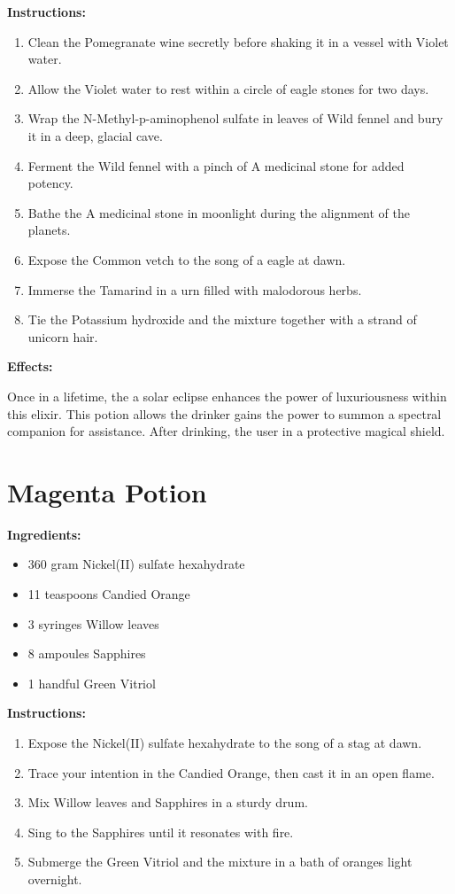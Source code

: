 \documentclass{article}
\begin{document}
\textbf{Instructions:}

\begin{enumerate}
  \item Clean the Pomegranate wine secretly before shaking it in a vessel with Violet water.
  \item Allow the Violet water to rest within a circle of eagle stones for two days.
  \item Wrap the N-Methyl-p-aminophenol sulfate in leaves of Wild fennel and bury it in a deep, glacial cave.
  \item Ferment the Wild fennel with a pinch of A medicinal stone for added potency.
  \item Bathe the A medicinal stone in moonlight during the alignment of the planets.
  \item Expose the Common vetch to the song of a eagle at dawn.
  \item Immerse the Tamarind in a urn filled with malodorous herbs.
  \item Tie the Potassium hydroxide and the mixture together with a strand of unicorn hair.
\end{enumerate}

\textbf{Effects:}

Once in a lifetime, the a solar eclipse enhances the power of luxuriousness within this elixir. This potion allows the drinker gains the power to summon a spectral companion for assistance. After drinking, the user in a protective magical shield.

\newpage
\section*{Magenta Potion}

\textbf{Ingredients:}

\begin{itemize}
  \item 360 gram Nickel(II) sulfate hexahydrate
  \item 11 teaspoons Candied Orange
  \item 3 syringes Willow leaves
  \item 8 ampoules Sapphires
  \item 1 handful Green Vitriol
\end{itemize}

\textbf{Instructions:}

\begin{enumerate}
  \item Expose the Nickel(II) sulfate hexahydrate to the song of a stag at dawn.
  \item Trace your intention in the Candied Orange, then cast it in an open flame.
  \item Mix Willow leaves and Sapphires in a sturdy drum.
  \item Sing to the Sapphires until it resonates with fire.
  \item Submerge the Green Vitriol and the mixture in a bath of oranges light overnight.
\end{enumerate}
\end{document}
